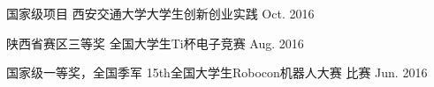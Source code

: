 
\begin{cvhonors}


  \cvhonor
    {国家级项目} %
    {西安交通大学大学生创新创业实践} %
    {} %
    {Oct. 2016} %

  \cvhonor
    {陕西省赛区三等奖} %
    {全国大学生Ti杯电子竞赛} %
    {} %
    {Aug. 2016} %

  \cvhonor
    {国家级一等奖，全国季军} %
    { 15th全国大学生Robocon机器人大赛 比赛} %
    {} %
    {Jun. 2016} %

\end{cvhonors}
